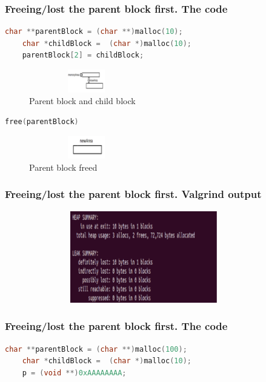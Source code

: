 \documentclass{bredelebeamer}
\begin{document}
\begin{frame}[fragile]
\frametitle{Freeing/lost the parent block first. The code} 
	\begin{center}
		\begin{lstlisting}[language=C++]
	char **parentBlock = (char **)malloc(10);
	char *childBlock =  (char *)malloc(10);
	parentBlock[2] = childBlock;
		\end{lstlisting}

		\begin{figure}
			\caption{Parent block and child block}
			\includegraphics[height=1cm,width=5cm]{freeing-parent-block-first.png}
		\end{figure}

		\begin{lstlisting}[language=C++]
		free(parentBlock)
		\end{lstlisting}
		\begin{figure}
			\caption{Parent block freed}
			\includegraphics[height=1cm,width=5cm]{freeing-parent-block-first2.png}
		\end{figure}
	\end{center}
\end{frame}

\begin{frame}[fragile]
	\frametitle{Freeing/lost the parent block first. Valgrind output}
	\begin{center}
		\begin{figure}
			\includegraphics[height=4cm,width=10cm]{freeing-parent-block-first-valgrind.png}
		\end{figure}
	\end{center}
\end{frame}

\begin{frame}[fragile]
\frametitle{Freeing/lost the parent block first. The code} 
	\begin{center}
		\begin{lstlisting}[language=C++]
	char **parentBlock = (char **)malloc(100);
	char *childBlock =  (char *)malloc(10);
	p = (void **)0xAAAAAAAA;
		\end{lstlisting}
	\end{center}
\end{frame}
\end{document}
